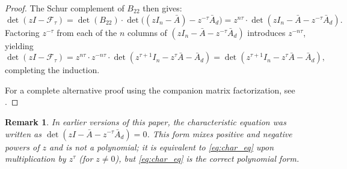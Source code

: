 \documentclass[10pt]{amsart}
\numberwithin{equation}{section}
\newtheorem{remark}[theorem]{Remark}
\begin{document}
\begin{proof}
The Schur complement of $B_{22}$ then gives:
\[
\det(zI - \mathcal{F}_\tau)
= \det(B_{22}) \cdot \det\!\bigl((zI_n-\bar{A}) - z^{-\tau}\bar{A}_d\bigr)
= z^{n\tau} \cdot \det(zI_n - \bar{A} - z^{-\tau}\bar{A}_d).
\]
Factoring $z^{-\tau}$ from each of the $n$ columns of $(zI_n - \bar{A} - z^{-\tau}\bar{A}_d)$
introduces $z^{-n\tau}$, yielding
\[
\det(zI - \mathcal{F}_\tau)
= z^{n\tau} \cdot z^{-n\tau} \cdot \det(z^{\tau+1}I_n - z^\tau\bar{A} - \bar{A}_d)
= \det(z^{\tau+1}I_n - z^\tau\bar{A} - \bar{A}_d),
\]
completing the induction.

For a complete alternative proof using the companion matrix factorization, see
\cite[Chapter~3, Proposition~3.2]{Niculescu2001}.
\end{proof}

\begin{remark}
In earlier versions of this paper, the characteristic equation was written as
$\det(zI - \bar{A} - z^{-\tau}\bar{A}_d) = 0$. This form mixes positive and negative
powers of $z$ and is not a polynomial; it is equivalent to \eqref{eq:char_eq} upon
multiplication by $z^\tau$ (for $z \neq 0$), but \eqref{eq:char_eq} is the correct
polynomial form.
\end{remark}
\end{document}
